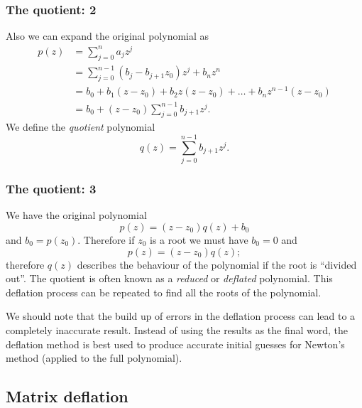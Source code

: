 \documentclass{beamer}
\begin{document}
\begin{frame}
  \frametitle{The quotient: 2}

  Also we can expand the original polynomial as
  \begin{align*}
    p(z) & = \sum_{j=0}^n a_j z^j \\
         & = \sum_{j=0}^{n-1} ( b_{j} - b_{j+1} z_0) z^j + b_n z^n \\
         & = b_0 + b_1 (z - z_0) + b_2 z (z - z_0) + \dots + b_n
         z^{n-1} (z - z_0) \\
         & = b_0 + (z - z_0) \sum_{j=0}^{n-1} b_{j+1} z^{j}.
  \end{align*} \pause
  We define the \emph{quotient} polynomial
  \begin{equation*}
    q(z) = \sum_{j=0}^{n-1} b_{j+1} z^{j}.
  \end{equation*}

\end{frame}

\begin{frame}
  \frametitle{The quotient: 3}

  We have the original polynomial
  \begin{equation*}
    p(z) = (z - z_0) q(z) + b_0
  \end{equation*}
  and $b_0 = p(z_0)$. \pause Therefore if $z_0$ is a root we must have
  $b_0 = 0$ and
  \begin{equation*}
    p(z) = (z - z_0) q(z);
  \end{equation*}
  therefore $q(z)$ describes the behaviour of the polynomial if the
  root is ``divided out''. \pause The quotient is often known as a
  \emph{reduced} or \emph{deflated} polynomial. \pause This deflation
  process can be repeated to find all the roots of the polynomial.
  \pause

  We should note that the build up of errors in the deflation process
  can lead to a completely inaccurate result. Instead of using the
  results as the final word, the deflation method is best used to
  produce accurate initial guesses for Newton's method (applied to the
  full polynomial).

\end{frame}


\subsection{Matrix deflation}
\end{document}
